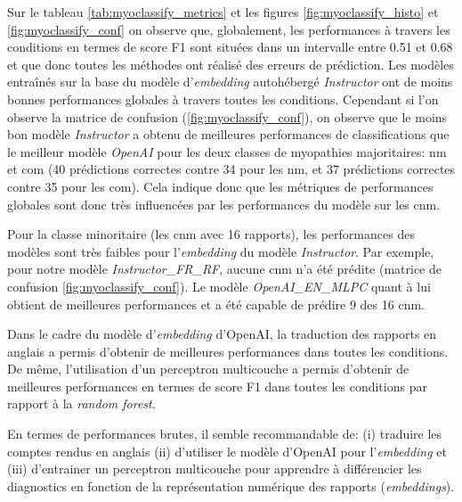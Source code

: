 Sur le tableau \ref{tab:myoclassify_metrics} et les figures \ref{fig:myoclassify_histo} et \ref{fig:myoclassify_conf} on observe que, globalement, les performances à travers les conditions en termes de score F1 sont situées dans un intervalle entre 0.51 et 0.68 et que donc toutes les méthodes ont réalisé des erreurs de prédiction. Les modèles entraînés sur la base du modèle d'\textit{embedding} autohébergé \textit{Instructor} ont de moins bonnes performances globales à travers toutes les conditions. Cependant si l'on observe la matrice de confusion (\ref{fig:myoclassify_conf}), on observe que le moins bon modèle \textit{Instructor} a obtenu de meilleures performances de classifications que le meilleur modèle \textit{OpenAI} pour les deux classes de myopathies majoritaires: \gls{nm} et \gls{com} (40 prédictions correctes contre 34 pour les \gls{nm}, et 37 prédictions correctes contre 35 pour les \gls{com}). Cela indique donc que les métriques de performances globales sont donc très influencées par les performances du modèle sur les \gls{cnm}.

Pour la classe minoritaire (les \gls{cnm} avec 16 rapports), les performances des modèles sont très faibles pour l'\textit{embedding} du modèle \textit{Instructor}. Par exemple, pour notre modèle \textit{Instructor\_FR\_RF}, aucune \gls{cnm} n'a été prédite (matrice de confusion \ref{fig:myoclassify_conf}). Le modèle \textit{OpenAI\_EN\_MLPC} quant à lui obtient de meilleures performances et a été capable de prédire 9 des 16 \gls{cnm}. 

Dans le cadre du modèle d'\textit{embedding} d'OpenAI, la traduction des rapports en anglais a permis d'obtenir de meilleures performances dans toutes les conditions. De même, l'utilisation d'un perceptron multicouche a permis d'obtenir de meilleures performances en termes de score F1 dans toutes les conditions par rapport à la \textit{random forest}.

En termes de performances brutes, il semble recommandable de: (i) traduire les comptes rendus en anglais (ii) d'utiliser le modèle d'OpenAI pour l'\textit{embedding} et (iii) d'entrainer un perceptron multicouche pour apprendre à différencier les diagnostics en fonction de la représentation numérique des rapports (\textit{embeddings}). 

